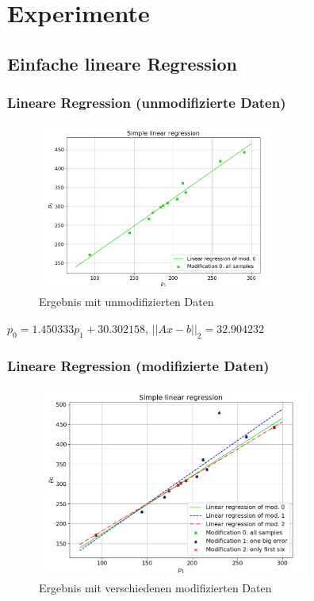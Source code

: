 \documentclass{beamer}
\begin{document}
\section{Experimente}
\subsection{Einfache lineare Regression}
\begin{frame} %
  \frametitle{Lineare Regression (unmodifizierte Daten)} %
\begin{figure}
  \centering
    \includegraphics[width=0.7\textwidth]{unmodified}
    \vspace{-1em}
  \caption{Ergebnis mit unmodifizierten Daten}
\end{figure}
\vspace{-1em}
\centering
$p_0 = 1.450333 p_1 + 30.302158$, $||Ax-b||_2 = 32.904232$

\end{frame}

\begin{frame} %
  \frametitle{Lineare Regression (modifizierte Daten)} %
  \begin{figure}
    \centering
      \includegraphics[width=0.8\textwidth]{Linear_Regression}
      \vspace{-1em}
    \caption{Ergebnis mit verschiedenen modifizierten Daten}
  \end{figure}
\end{frame}
\end{document}
